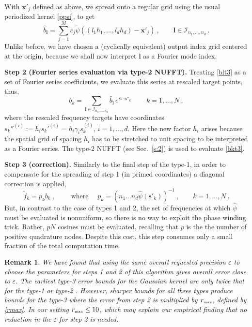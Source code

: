 \documentclass[10pt]{article}
\newcommand{\be}{\begin{equation}}
\newcommand{\ee}{\end{equation}}
\newcommand{\tbox}[1]{{\mbox{\tiny #1}}}
\newcommand{\mbf}[1]{{\mathbf #1}}
\newcommand{\eps}{\varepsilon}
\newtheorem{rmk}[thm]{Remark}
\newcommand{\xx}{\mbf{x}}
\newcommand{\sss}{\mbf{s}}
\newcommand{\KK}{{\mathcal I}}     %
\newcommand{\ppsi}{{\tilde\psi}}   %
\newcommand{\rmax}{r_\tbox{max}}    %
\newcommand{\NU}{{nonuniform}}       %
\begin{document}
With $\xx'_j$ defined as above,
we spread onto a regular grid using the usual
periodized kernel \eqref{ppsi}, to get
\be
\hat b_\mbf{l} = \sum_{j=1}^M c_j \ppsi((l_1h_1,\dots,l_dh_d)-\xx'_j)~,
\qquad \mbf{l} \in \KK_{n_1,\dots,n_d}~.
\label{blt3}
\ee
Unlike before, we have chosen a (cyclically equivalent) output index
grid centered at the origin, because we
shall now interpret $\mbf{l}$ as a Fourier mode index.

{\bf Step 2 (Fourier series evaluation via type-2 NUFFT).}
Treating \eqref{blt3} as a set of Fourier series coefficients, we
evaluate this series at rescaled target points, thus,
\be
b_k = \sum_{\mbf{l} \in \KK_{n_1,\dots,n_d}}
\!\! \hat b_\mbf{l} \, e^{i\mbf{l}\cdot \sss''_k}
\,\qquad k=1,\dots,N
~,
\label{bkt3}
\ee
where the rescaled frequency targets have coordinates
${s_k''}^{(i)} := h_i {s_k'}^{(i)} = h_i\gamma_i s_k^{(i)}$, $i=1,\dots,d$.
Here the new factor $h_i$ arises because the spatial grid of spacing $h_i$
has to be stretched to unit spacing to be interpreted as a Fourier series.
The type-2 NUFFT (see Sec.~\ref{s:2}) is used to evaluate \eqref{bkt3}.

{\bf Step 3 (correction).}
Similarly to the final step of the type-1,
in order to compensate for the spreading of step 1 (in primed coordinates)
a diagonal correction is applied,
$$
\tilde f_k = p_k b_k
~,\qquad 
\mbox{ where }
\quad p_k = (n_1\dots n_d \hat\psi(\sss'_k))^{-1}~, \qquad k=1,\dots,N
~.
$$
But, in contrast to the case of types 1 and 2,
the set of frequencies at which $\hat\psi$ must be evaluated is %
\NU, so there is no way to exploit the phase winding trick.
Rather, $pN$ cosines must be evaluated,
recalling that $p$ is the the number of positive quadrature nodes.
Despite this cost, this step consumes only a small fraction of the
total computation time.

\begin{rmk}
  We have found that using the same overall requested precision $\eps$ to
  choose the parameters for steps 1 and 2 of this algorithm
  gives overall error close to $\eps$.
  The earliest type-3 error bounds for the Gaussian kernel are only twice that
  for the type-1 or type-2 \cite[Obs.~5.6]{nufft}.
  However, sharper bounds \cite[p.~45]{elbel} for all three types produce
  bounds for the type-3 where the error from step 2 is multiplied by
  $\rmax$, defined by \eqref{rmax}.
  In our setting $\rmax \le 10$, which may explain our empirical finding
  that no reduction in the $\eps$ for step 2 is needed.
\end{rmk}
\end{document}
